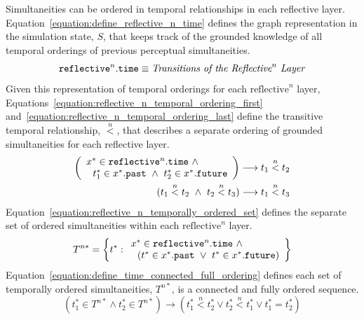 Simultaneities can be ordered in temporal relationships in each
reflective layer.
{\mbox{Equation~\ref{equation:define_reflective_n_time}}} defines the
graph representation in the simulation state, $S$, that keeps track of
the grounded knowledge of all temporal orderings of previous
perceptual simultaneities.
\begin{equation}
\label{equation:define_reflective_n_time}
\text{\tt{reflective}}^n.\text{\tt{time}} \equiv \text{\emph{Transitions of the $\text{Reflective}^n$ Layer}}
\end{equation}
Given this representation of temporal orderings for each
$\text{reflective}^n$ layer,
{\mbox{Equations~\ref{equation:reflective_n_temporal_ordering_first}}}
{\mbox{and~\ref{equation:reflective_n_temporal_ordering_last}}} define
the transitive temporal relationship, $\stackrel{n}{<}$, that
describes a separate ordering of grounded simultaneities for each
reflective layer.
\begin{align}
\label{equation:reflective_n_temporal_ordering_first}
\left(\begin{array}{l}
  x^* \in \text{\tt{reflective}}^n.\text{\tt{time}} ~\wedge~ \\
  ~~t_1^* \in x^*.\text{\tt{past}} ~\wedge~ t_2^* \in x^*.\text{\tt{future}}
\end{array}\right) &\longrightarrow t_1 \stackrel{n}{<} t_2 \\
\label{equation:reflective_n_temporal_ordering_last}
(t_1 \stackrel{n}{<} t_2 ~\wedge~ t_2 \stackrel{n}{<} t_3) &\longrightarrow t_1 \stackrel{n}{<} t_3
\end{align}
{\mbox{Equation~\ref{equation:reflective_n_temporally_ordered_set}}}
defines the separate set of ordered simultaneities within each
$\text{reflective}^n$ layer.
\begin{equation}
\label{equation:reflective_n_temporally_ordered_set}
 T^{n*} = \left\{t^* : 
\begin{array}{l}
  x^* \in \text{\tt{reflective}}^n.\text{\tt{time}} ~\wedge~ \\
  ~~(t^* \in x^*.\text{\tt{past}} ~\vee~ t^* \in x^*.\text{\tt{future}})
\end{array}\right\}
\end{equation}
{\mbox{Equation~\ref{equation:define_time_connected_full_ordering}}}
defines each set of temporally ordered simultaneities, $T^{n*}$, is a
connected and fully ordered sequence.
\begin{equation}
\label{equation:define_time_connected_full_ordering}
(t^*_1 \in T^{n*} \wedge t^*_2 \in T^{n*}) \longrightarrow (t^*_1 \stackrel{n}{<} t^*_2 \vee t^*_2 \stackrel{n}{<} t^*_1 \vee t^*_1 = t^*_2)
\end{equation}
